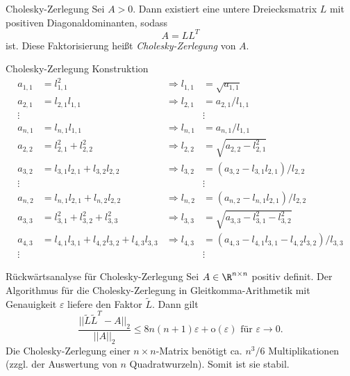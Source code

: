 \begin{karte}{Cholesky-Zerlegung}
    Sei \( A > 0 \). Dann existiert eine untere Dreiecksmatrix \( L \) mit positiven Diagonaldominanten, sodass 
    \[ A = L L^T \]
    ist. Diese Faktorisierung heißt \textit{Cholesky-Zerlegung} von \(A\).
\end{karte}

\begin{karte}{Cholesky-Zerlegung Konstruktion}
    \begin{align*}
        a_{1,1} &= l_{1,1}^2 &\Longrightarrow l_{1,1} &= \sqrt{a_{1,1}} \\
        a_{2,1} &= l_{2,1} l_{1,1} &\Longrightarrow l_{2,1} &= a_{2,1} / l_{1,1} \\
        \vdots &&&\vdots \\
        a_{n,1} &= l_{n,1} l_{1,1} &\Longrightarrow l_{n,1} &= a_{n,1} / l_{1,1} \\
        a_{2,2} &= l_{2,1}^2 + l_{2,2}^2 &\Longrightarrow l_{2,2} &= \sqrt{a_{2,2} - l_{2,1}^2} \\
        a_{3,2} &= l_{3,1} l_{2,1} + l_{3,2} l_{2,2} &\Longrightarrow l_{3,2} &= (a_{3,2} - l_{3,1} l_{2,1})/l_{2,2} \\
        \vdots &&& \vdots \\
        a_{n,2} &= l_{n,1}l_{2,1} + l_{n,2}l_{2,2} &\Longrightarrow l_{n,2} &= (a_{n,2} - l_{n,1}l_{2,1})/l_{2,2} \\
        a_{3,3} &= l_{3,1}^2 + l_{3,2}^2 + l_{3,3}^2 &\Longrightarrow l_{3,3} &= \sqrt{a_{3,3} - l_{3,1}^2 - l_{3,2}^2} \\
        a_{4,3} &= l_{4,1}l_{3,1} + l_{4,2} l_{3,2} + l_{4,3} l_{3,3} &\Longrightarrow l_{4,3} &= (a_{4,3} - l_{4,1} l_{3,1} - l_{4,2} l_{3,2}) / l_{3,3} \\
        \vdots &&& \vdots
    \end{align*}
\end{karte}

\begin{karte}{Rückwärtsanalyse für Cholesky-Zerlegung}
    Sei \( A \in \R^{n\times n} \) positiv definit. Der Algorithmus für die Cholesky-Zerlegung in 
    Gleitkomma-Arithmetik mit Genauigkeit \( \varepsilon \) liefere den Faktor \( \tilde{L} \). 
    Dann gilt 
    \[ \frac{ ||\tilde{L}\tilde{L}^T - A||_2 }{ ||A||_2 } \leq 8 n (n+1)\varepsilon + \mathrm{o}(\varepsilon) \text{ für } \varepsilon \rightarrow 0. \]
    Die Cholesky-Zerlegung einer \( n\times n \)-Matrix benötigt ca. \( n^3/6 \) Multiplikationen 
    (zzgl. der Auswertung von \(n\) Quadratwurzeln). Somit ist sie stabil.
\end{karte}